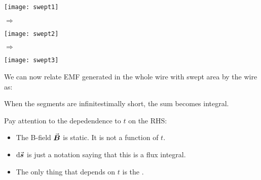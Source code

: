 \documentclass[class=article, crop=false, 12pt]{standalone}
\begin{document}
\begin{center}
    \begin{minipage}{0.15\linewidth}
        \centering
        \texttt{[image: swept1]}
    \end{minipage}
    {\huge \quad $\Rightarrow$\quad }
    \begin{minipage}{0.15\linewidth}
        \centering
        \texttt{[image: swept2]}
    \end{minipage}
    {\huge \quad $\Rightarrow$\quad }
    \begin{minipage}{0.15\linewidth}
        \centering
        \texttt{[image: swept3]}
    \end{minipage}
\end{center}

We can now relate EMF generated in the whole wire with swept area by the wire as:

When the segments are infinitestimally short, the sum becomes integral.

Pay attention to the depedendence to $t$ on the RHS:
\begin{itemize}
    \item The B-field $\va*{B}$ is static. It is not a function of $t$.
    
    \item $\dd{\va*{s}}$ is just a notation saying that this is a flux integral. 

    \item The only thing that depends on $t$ is the .
\end{itemize}
\end{document}
